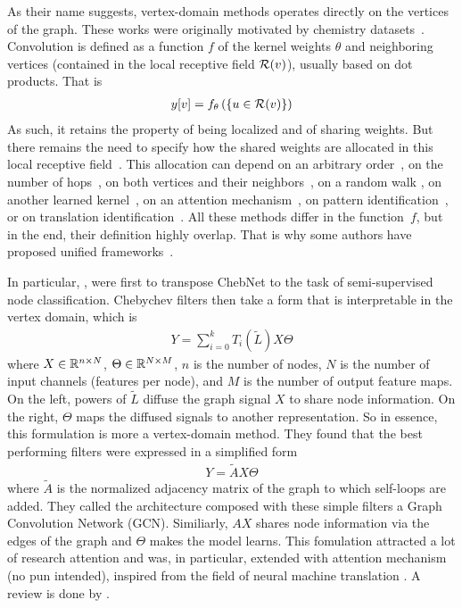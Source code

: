 As their name suggests, vertex-domain methods operates directly on the vertices of the graph. These works were originally motivated by chemistry datasets~\citep{duvenaud2015convolutional,kearnes2016molecular}. Convolution is defined as a function $f$ of the kernel weights $\theta$ and neighboring vertices (contained in the local receptive field $\mathcal{R}(v)$), usually based on dot products. That is
\begin{gather}
y[v] = f_\theta\left(\{u \in \mathcal{R}(v)\}\right)
\end{gather}
As such, it retains the property of being localized and of sharing weights. But there remains the need to specify how the shared weights are allocated in this local receptive field~\citep{vialatte2016generalizing}. This allocation can depend on \eg an arbitrary order~\citep{niepert2016learning}, on the number of hops~\citep{atwood2016diffusion,du2017topology}, on both vertices and their neighbors~\citep{monti2016geometric,simonovsky2017dynamic}, on a random walk \citep{hechtlinger2017generalization}, on another learned kernel~\citep{vialatte2017learning}, on an attention mechanism~\citep{velickovic2017graph,lee2018attention}, on pattern identification~\citep{sankar2017motif}, or on translation identification~\citep{pasdeloup2017convolutional}. All these methods differ in the function~$f$, but in the end, their definition highly overlap. That is why some authors have proposed unified frameworks~\citep{gilmer2017neural}.

In particular, \cite{kipf2016semi}, were first to transpose ChebNet to the task of semi-supervised node classification. Chebychev filters then take a form that is interpretable in the vertex domain, which is
\begin{gather}
Y = \displaystyle\sum_{i=0}^k T_i(\widetilde{L}) X \Theta
\end{gather}
where $X \in \mathbb{R}^{n \times N}$, $\Theta \in \mathbb{R}^{N \times M}$, $n$ is the number of nodes, $N$ is the number of input channels (features per node), and $M$ is the number of output feature maps. On the left, powers of $\widetilde{L}$ diffuse the graph signal $X$ to share node information. On the right, $\Theta$ maps the diffused signals to another representation. So in essence, this formulation is more a vertex-domain method. They found that the best performing filters were expressed in a simplified form
\begin{gather}
Y = \widetilde{A} X \Theta
\end{gather}
where $\widetilde{A}$ is the normalized adjacency matrix of the graph to which self-loops are added. They called the architecture composed with these simple filters a Graph Convolution Network (GCN). Similiarly, $AX$ shares node information via the edges of the graph and $\Theta$ makes the model learns. This fomulation attracted a lot of research attention and was, in particular, extended with attention mechanism (no pun intended), inspired from the field of neural machine translation \citep{bahdanau2014neural}. A review is done by \cite{lee2018attention}.

